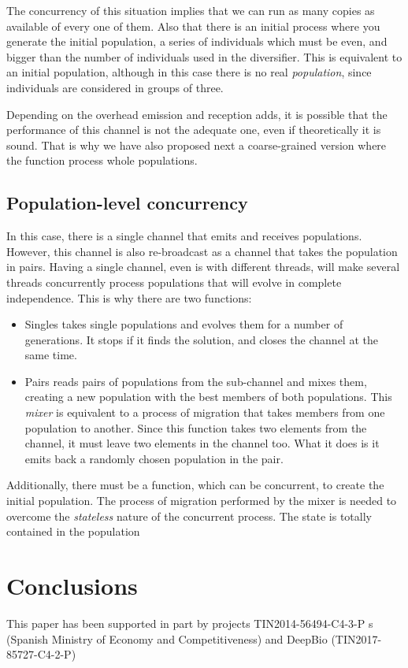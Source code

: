 \documentclass[sigconf]{acmart}
\begin{document}
The concurrency of this situation implies that we can run as many
copies as available of every one of them. Also that there is an
initial process where you generate the initial population, a series of
individuals which must be even, and bigger than the number of
individuals used in the diversifier. This is equivalent to an initial
population, although in this case there is no real {\em population},
since individuals are considered in groups of three. 

Depending on the overhead emission and reception adds, it is possible
that the performance of this channel is not the adequate one, even if
theoretically it is sound. That is why we have also proposed next a
coarse-grained version where the function process whole populations.

\subsection{Population-level concurrency}

In this case, there is a single channel that emits and receives
populations. However, this channel is also re-broadcast as a channel
that takes the population in pairs. Having a single channel, even is with
different threads, will make several threads concurrently process
populations that will evolve in complete independence. This is why
there are two functions: \begin{itemize}
\item {\sf Singles} takes single populations and evolves them for a
  number of generations. It stops if it finds the solution, and closes
  the channel at the same time.
\item {\sf Pairs} reads pairs of populations from the sub-channel and
  mixes them, creating a new population with the best members of both
  populations. This {\em mixer} is equivalent to a process of
  migration that takes members from one population to another. Since
  this function takes two elements from the channel, it must leave two
  elements in the channel too. What it does is it emits back a
  randomly chosen population in the pair. 
\end{itemize}

Additionally, there must be a function, which can be concurrent, to
create the initial population. The process of migration performed by
the mixer is needed to overcome the {\em stateless}
nature of the concurrent process. The state is totally contained in
the population


\section{Conclusions}
\label{sec:conclusions}

\begin{acks}

  This paper has been supported in part by
projects TIN2014-56494-C4-3-P s (Spanish Ministry of Economy and
Competitiveness) and DeepBio (TIN2017-85727-C4-2-P)


\end{acks}




\end{document}
